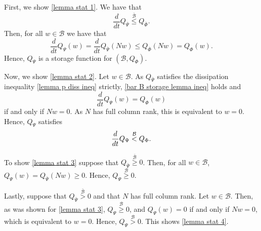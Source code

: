 \documentclass[letterpaper, 10 pt, conference]{ieeeconf}
\makeatletter
\renewenvironment{proof}[1][\proofname]{\par
\pushQED{\qed}%
\normalfont \topsep\z@
\trivlist
\item[\hskip2em
\itshape
#1\@addpunct{:}]\ignorespaces
}{%
\popQED\endtrivlist\@endpefalse
}
\theoremstyle{ieeeconf}
\newcommand{\B}{\mathcal{B}}
\makeatother
\begin{document}
\begin{proof}
	First, we show \ref{lemma stat 1}. We have that 
	\begin{equation}\frac{d}{dt}Q_{\bar{\Psi}} \stackrel{\bar{\B}}{\leq}Q_{\bar{\Phi}}.\label{lemma p diss ineq}\end{equation} Then, for all $w\in \B$ we have that 
	\begin{equation}\frac{d}{dt}Q_{\Psi}(w) =\frac{d}{dt}Q_{\bar{\Psi}}(Nw) \leq Q_{\bar{\Phi}}(Nw)=Q_\Phi(w). \label{bar B storage lemma ineq}\end{equation}
	Hence, $Q_{\Psi}$ is a storage function for $(\B,Q_{\Phi})$.
	
	Now, we show \ref{lemma stat 2}. Let $w\in \B$. As $Q_{\bar{\Psi}}$ satisfies the dissipation inequality \eqref{lemma p diss ineq} strictly, \eqref{bar B storage lemma ineq} holds and
	\begin{equation*}\frac{d}{dt}Q_{\Psi}(w) =Q_{\Phi}(w)\end{equation*} 
	if and only if $Nw=0$. As $N$ has full column rank, this is equivalent to $w=0$. Hence, $Q_{\Psi}$ satisfies 
	\begin{equation*}\frac{d}{dt}Q_{\Psi} \stackrel{\B}{<}Q_{\Phi}. \vspace{-0.5ex}\end{equation*}
	
	To show \ref{lemma stat 3} suppose that $Q_{\bar{\Psi}} \stackrel{\bar{\B}}{\geq}0$. Then, for all $w\in \B$, $Q_{\Psi}(w)=Q_{\bar{\Psi}}(Nw)\geq 0$. Hence, $Q_{\Psi} \stackrel{\B}{\geq}0$. 
	
	Lastly, suppose that $Q_{\bar{\Psi}} \stackrel{\bar{\B}}{>}0$ and that $N$ has full column rank. Let $w\in \B$. Then, as was shown for \ref{lemma stat 3}, $Q_{\Psi}\stackrel{\B}{\geq}0$, and $Q_{\Psi}(w)=0$ if and only if $Nw=0$, which is equivalent to $w=0$. Hence, $Q_{\Psi} \stackrel{\B}{>}0$. This shows \ref{lemma stat 4}.
\end{proof}


\end{document}
